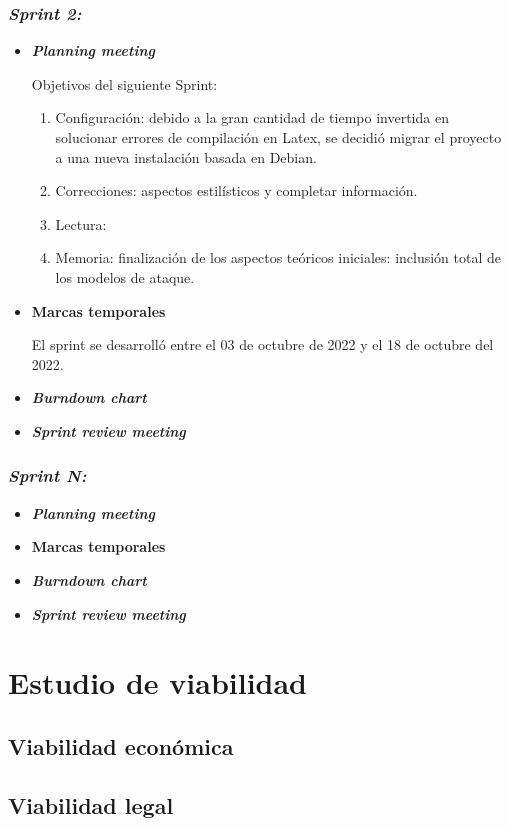 \subsubsection{\textit{Sprint 2:}}

\begin{itemize}
	\item \textbf{\textit{Planning meeting}}
	
	Objetivos del siguiente Sprint:
	
		\begin{enumerate}
			
		\item Configuración: debido a la gran cantidad de tiempo invertida en solucionar errores de compilación en Latex, se decidió migrar el proyecto a una nueva instalación basada en Debian.
		\item Correcciones: aspectos estilísticos y completar información.
		
		\item Lectura: 
		\item Memoria: finalización de los aspectos teóricos iniciales: inclusión total de los modelos de ataque.
		
	\end{enumerate}

	\item \textbf{Marcas temporales}
	
El sprint se desarrolló entre el 03 de octubre de 2022 y el 18 de octubre del 2022.
			
	\item \textbf{\textit{Burndown chart}}
	\item \textbf{\textit{Sprint review meeting}}
\end{itemize}





\subsubsection{\textit{Sprint N:}}
\begin{itemize}
	\item \textbf{\textit{Planning meeting}}
	\item \textbf{Marcas temporales}		
	\item \textbf{\textit{Burndown chart}}
	\item \textbf{\textit{Sprint review meeting}}
\end{itemize}


\section{Estudio de viabilidad}

\subsection{Viabilidad económica}

\subsection{Viabilidad legal}


